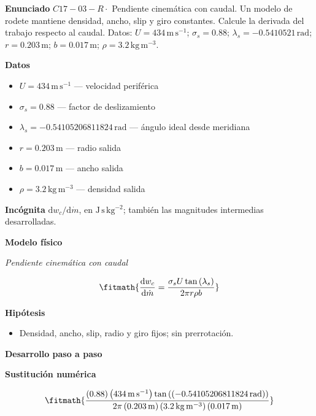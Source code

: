 \documentclass[10pt,openany]{book}
\begin{document}
\begin{tcolorbox}[title={Problema resuelto 3}, studiumworked, breakable]

\noindent\textbf{Enunciado}
\(C17-03-R \cdot\) Pendiente cinemática con caudal. Un modelo de rodete mantiene densidad, ancho, slip y giro constantes. Calcule la derivada del trabajo respecto al caudal. Datos: \(U=434\, \mathrm{m}\,\mathrm{s}^{-1}\); \(\sigma_s=0.88\); \(\lambda_s=-0.5410521\, \mathrm{rad}\); \(r=0.203\, \mathrm{m}\); \(b=0.017\, \mathrm{m}\); \(\rho=3.2\, \mathrm{kg}\,\mathrm{m}^{-3}\).

\noindent\textbf{Datos}
\begin{itemize}
\item $U = 434\,\mathrm{m}\,\mathrm{s}^{-1}$ — velocidad periférica
\item $\sigma_s = 0.88$ — factor de deslizamiento
\item $\lambda_s = -0.54105206811824\,\mathrm{rad}$ — ángulo ideal desde meridiana
\item $r = 0.203\,\mathrm{m}$ — radio salida
\item $b = 0.017\,\mathrm{m}$ — ancho salida
\item $\rho = 3.2\,\mathrm{kg}\,\mathrm{m}^{-3}$ — densidad salida
\end{itemize}

\noindent\textbf{Incógnita}
$\mathrm{d}w_c/\mathrm{d}\dot{m}$, en $\mathrm{J\,s\,kg^{-2}}$; también las magnitudes intermedias desarrolladas.

\noindent\textbf{Modelo físico}

\noindent\textit{Pendiente cinemática con caudal}

\[
\fitmath{\frac{\mathrm{d}w_c}{\mathrm{d}\dot{m}}=\frac{\sigma_s U \tan{\left(\lambda_s \right)}}{2 \pi r \rho b}}
\]

\noindent\textbf{Hipótesis}
\begin{itemize}
\item Densidad, ancho, slip, radio y giro fijos; sin prerrotación.
\end{itemize}

\noindent\textbf{Desarrollo paso a paso}



\noindent\textbf{Sustitución numérica}

\[
\fitmath{\frac{\left(0.88\right) \left(434\,\mathrm{m}\,\mathrm{s}^{-1}\right) \tan{\left(\left(-0.54105206811824\,\mathrm{rad}\right) \right)}}{2 \pi \left(0.203\,\mathrm{m}\right) \left(3.2\,\mathrm{kg}\,\mathrm{m}^{-3}\right) \left(0.017\,\mathrm{m}\right)}}
\]


\end{tcolorbox}
\end{document}
